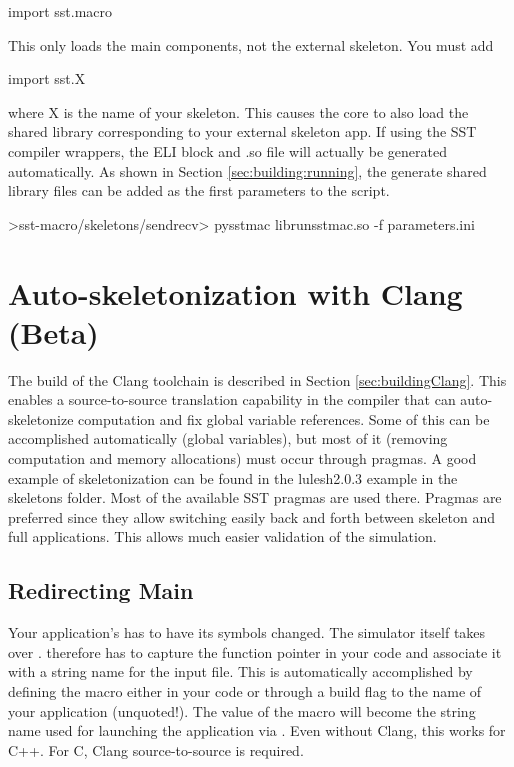 \begin{ViFile}
import sst.macro
\end{ViFile}
This only loads the main components, not the external skeleton. You must add

\begin{ViFile}
import sst.X
\end{ViFile}
where X is the name of your skeleton. This causes the core to also load the shared library corresponding to your external skeleton app.
If using the SST compiler wrappers, the ELI block and .so file will actually be generated automatically.  As shown in Section \ref{sec:building:running},
the generate shared library files can be added as the first parameters to the  script.

\begin{ShellCmd}
>sst-macro/skeletons/sendrecv> pysstmac librunsstmac.so -f parameters.ini
\end{ShellCmd} 

\section{Auto-skeletonization with Clang (Beta)}
\label{sec:autoSkeletonization}

The build of the Clang toolchain is described in Section \ref{sec:buildingClang}. 
This enables a source-to-source translation capability in the  compiler that can auto-skeletonize computation and fix global variable references.
Some of this can be accomplished automatically (global variables), but most of it (removing computation and memory allocations) must occur through pragmas.
A good example of skeletonization can be found in the lulesh2.0.3 example in the skeletons folder. Most of the available SST pragmas are used there.
Pragmas are preferred since they allow switching easily back and forth between skeleton and full applications.
This allows much easier validation of the simulation.

\subsection{Redirecting Main}
Your application's  has to have its symbols changed.
The simulator itself takes over .
\sstmacro therefore has to capture the function pointer in your code and associate it with a string name for the input file.
This is automatically accomplished by defining the macro  either in your code or through a  build flag to the name of your application (unquoted!). The value of the macro will become the string name used for launching the application via .
Even without Clang, this works for C++. For C, Clang source-to-source is required.

